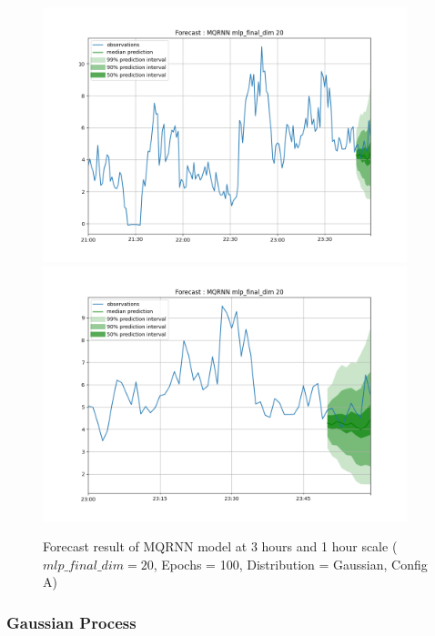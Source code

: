 \documentclass[a4paper, 12pt]{article}
\begin{document}
\begin{figure}[!h]
    \centering
    \includegraphics[width=400px]{plots/forecast/a/MQRNN/mlp_final_dim/20/180.png}
    \includegraphics[width=400px]{plots/forecast/a/MQRNN/mlp_final_dim/20/60.png}
    \caption{Forecast result of MQRNN model at 3 hours and 1 hour scale ($mlp\_final\_dim = 20 $, Epochs = 100, Distribution = Gaussian, Config A)}
    \label{fig:mqrnn}
\end{figure}


\subsubsection{Gaussian Process} \label{comp_gp}
\end{document}

